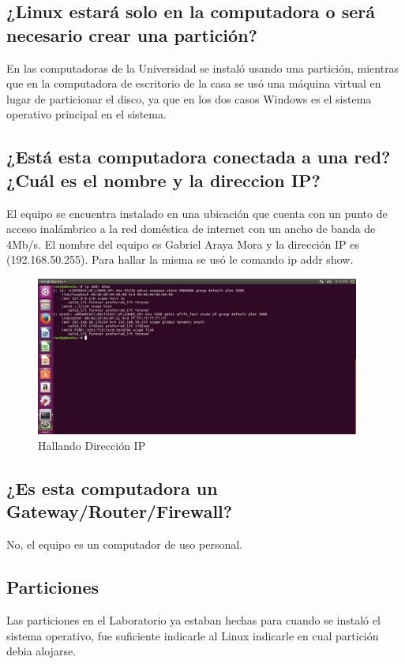 \documentclass[
  letterpaper, 
  maincolor=black,
  sectioncolor=black!90,
  subsectioncolor=black!70,
  itemtextcolor=black!40,
]{fortysecondscv}
\begin{document}
\subsection{¿Linux estará solo en la computadora o será necesario crear una partición?}
    En las computadoras de la Universidad se instaló usando una partición, mientras que en la computadora de escritorio de la casa se usó una máquina virtual en lugar de particionar el disco, ya que en los dos casos Windows es el sistema operativo principal en el sistema.
\subsection{¿Está esta computadora conectada a una red?¿Cuál es el nombre y la direccion IP?}
    El equipo se encuentra instalado en una ubicación que cuenta con un punto de acceso inalámbrico a la red doméstica de internet con un ancho de banda de 4Mb/s. El nombre del equipo es Gabriel Araya Mora y la dirección IP es (192.168.50.255). Para hallar la misma se usó le comando ip addr show.
    \begin{figure}[H]
        \centering
        \includegraphics[trim= 0 370 335 0,clip,width=0.95\textwidth]{img/IPLAb.jpg}
        \caption{Hallando Dirección IP}
        \label{fig:my_label}
    \end{figure}
\subsection{¿Es esta computadora un Gateway/Router/Firewall?}
    No, el equipo es un computador de uso personal.
\subsection{Particiones}
    Las particiones en el Laboratorio ya estaban hechas para cuando se instaló el sistema operativo, fue suficiente indicarle al Linux indicarle en cual partición debia alojarse.
\end{document}
